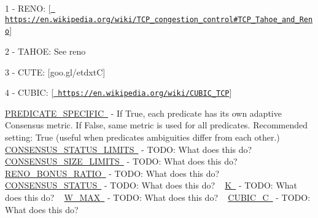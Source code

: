 \begin{DoxyItemize}
\item 1 -\/ R\+E\+NO\+: \mbox{[}\href{https://en.wikipedia.org/wiki/TCP_congestion_control\#TCP_Tahoe_and_Reno}{\texttt{ https\+://en.\+wikipedia.\+org/wiki/\+T\+C\+P\+\_\+congestion\+\_\+control\#\+T\+C\+P\+\_\+\+Tahoe\+\_\+and\+\_\+\+Reno}}\mbox{]}
\item 2 -\/ T\+A\+H\+OE\+: See reno
\item 3 -\/ C\+U\+TE\+: \mbox{[}goo.\+gl/etdxtC\mbox{]}
\item 4 -\/ C\+U\+B\+IC\+: \mbox{[}\href{https://en.wikipedia.org/wiki/CUBIC_TCP}{\texttt{ https\+://en.\+wikipedia.\+org/wiki/\+C\+U\+B\+I\+C\+\_\+\+T\+CP}}\mbox{]}
\end{DoxyItemize}

\mbox{\hyperlink{namespacedynamicfilterapp_1_1toggles_a2826a54e707f46fbd0fa2f8f6219ead7}{P\+R\+E\+D\+I\+C\+A\+T\+E\+\_\+\+S\+P\+E\+C\+I\+F\+IC }} -\/ If True, each predicate has its own adaptive Consensus metric. If False, same metric is used for all predicates. Recommended setting\+: True (useful when predicates\textquotesingle{} ambiguities differ from each other.) ~\newline
 \mbox{\hyperlink{namespacedynamicfilterapp_1_1toggles_a36cac18f3d673a6f2cd86c88127e41b9}{C\+O\+N\+S\+E\+N\+S\+U\+S\+\_\+\+S\+T\+A\+T\+U\+S\+\_\+\+L\+I\+M\+I\+TS }} -\/ T\+O\+DO\+: What does this do? ~\newline
 \mbox{\hyperlink{namespacedynamicfilterapp_1_1toggles_a1a20e4a8af9569eaef5eb5b23f07222b}{C\+O\+N\+S\+E\+N\+S\+U\+S\+\_\+\+S\+I\+Z\+E\+\_\+\+L\+I\+M\+I\+TS }} -\/ T\+O\+DO\+: What does this do? ~\newline
 \mbox{\hyperlink{namespacedynamicfilterapp_1_1toggles_a18fd240c30a7c4a6ee9df12436a744ab}{R\+E\+N\+O\+\_\+\+B\+O\+N\+U\+S\+\_\+\+R\+A\+T\+IO }} -\/ T\+O\+DO\+: What does this do? ~\newline
 \mbox{\hyperlink{namespacedynamicfilterapp_1_1toggles_a090eab76b7b0e234f422b87e30adf793}{C\+O\+N\+S\+E\+N\+S\+U\+S\+\_\+\+S\+T\+A\+T\+US }} -\/ T\+O\+DO\+: What does this do? ~\newline
 \mbox{\hyperlink{namespacedynamicfilterapp_1_1toggles_a2689c4b3931025b79053532a5f1b0a85}{K }} -\/ T\+O\+DO\+: What does this do? ~\newline
 \mbox{\hyperlink{namespacedynamicfilterapp_1_1toggles_add63171ca968cbd5ca4d60dfbf9a2746}{W\+\_\+\+M\+AX }} -\/ T\+O\+DO\+: What does this do? ~\newline
 \mbox{\hyperlink{namespacedynamicfilterapp_1_1toggles_a073a7aa1bc6b8c92d5682922759765fd}{C\+U\+B\+I\+C\+\_\+C }} -\/ T\+O\+DO\+: What does this do? ~\newline
